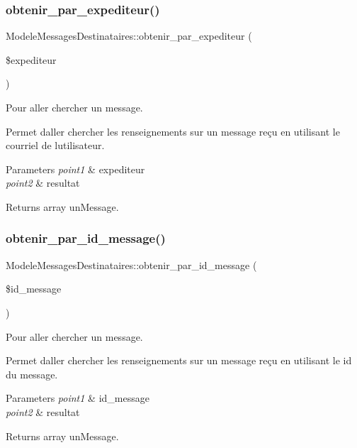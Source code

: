 \subsubsection{\texorpdfstring{obtenir\+\_\+par\+\_\+expediteur()}{obtenir\_par\_expediteur()}}
{\footnotesize\ttfamily Modele\+Messages\+Destinataires\+::obtenir\+\_\+par\+\_\+expediteur (\begin{DoxyParamCaption}\item[{}]{\$expediteur }\end{DoxyParamCaption})}



Pour aller chercher un message. 

Permet d\textquotesingle{}aller chercher les renseignements sur un message reçu en utilisant le courriel de l\textquotesingle{}utilisateur. 
\begin{DoxyParams}{Parameters}
{\em point1} & expediteur \\
\hline
{\em point2} & resultat \\
\hline
\end{DoxyParams}
\begin{DoxyReturn}{Returns}
array un\+Message. 
\end{DoxyReturn}
\mbox{\label{class_modele_messages_destinataires_adbd5b1dbcef064d777717cdbd705b79f}} 
\subsubsection{\texorpdfstring{obtenir\+\_\+par\+\_\+id\+\_\+message()}{obtenir\_par\_id\_message()}}
{\footnotesize\ttfamily Modele\+Messages\+Destinataires\+::obtenir\+\_\+par\+\_\+id\+\_\+message (\begin{DoxyParamCaption}\item[{}]{\$id\+\_\+message }\end{DoxyParamCaption})}



Pour aller chercher un message. 

Permet d\textquotesingle{}aller chercher les renseignements sur un message reçu en utilisant le id du message. 
\begin{DoxyParams}{Parameters}
{\em point1} & id\+\_\+message \\
\hline
{\em point2} & resultat \\
\hline
\end{DoxyParams}
\begin{DoxyReturn}{Returns}
array un\+Message. 
\end{DoxyReturn}
\mbox{\label{class_modele_messages_destinataires_a559f56ecfe8cc751b932fac36171f1a9}} 
